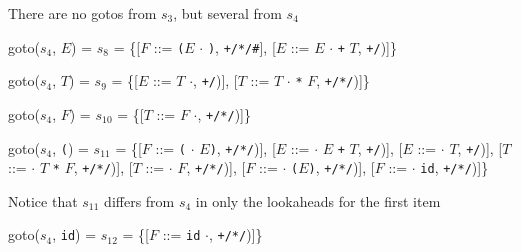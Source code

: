 \documentclass[8pt,a4paper,compress,handout]{beamer}
\newcommand{\mm}[1]{$#1$}
\newcommand{\subs}[2]{${#1}_{#2}$}
\newenvironment{spaced}
{
\smallskip
\hspace{.5cm}
\begin{minipage}[c]{\textwidth}
}
{
\end{minipage}
\smallskip
}
\begin{document}
\begin{frame}[fragile]
\pause

There are no gotos from $s_3$, but several from $s_4$

\text{ }
\begin{spaced}
\begin{production}
goto(\subs{s}{4}, \mm{E}) = \subs{s}{8}
                = \{[\mm{F}  ::= \lstinline{(}\mm{E} \mm{\cdot} \lstinline{)},  \lstinline{+/*/#}],
                    [\mm{E}  ::= \mm{E} \mm{\cdot} \lstinline{+} \mm{T}, \lstinline{+/})]\}

goto(\subs{s}{4}, \mm{T}) = \subs{s}{9}
                = \{[\mm{E}  ::= \mm{T} \mm{\cdot}, \lstinline{+/})],
                    [\mm{T}  ::= \mm{T} \mm{\cdot} \lstinline{*} \mm{F}, \lstinline{+/*/})]\}

goto(\subs{s}{4}, \mm{F}) = \subs{s}{10}
                = \{[\mm{T}  ::= \mm{F} \mm{\cdot}, \lstinline{+/*/})]\}

goto(\subs{s}{4}, \lstinline{(}) = \subs{s}{11}
               = \{[\mm{F}  ::= \lstinline{(} \mm{\cdot} \mm{E}\lstinline{)}, \lstinline{+/*/})],
                    [\mm{E}  ::= \mm{\cdot} \mm{E} \lstinline{+} \mm{T}, \lstinline{+/})],
                    [\mm{E}  ::= \mm{\cdot} \mm{T}, \lstinline{+/})],
                    [\mm{T}  ::= \mm{\cdot} \mm{T} \lstinline{*} \mm{F}, \lstinline{+/*/})],
                    [\mm{T}  ::= \mm{\cdot} \mm{F}, \lstinline{+/*/})],
                    [\mm{F}  ::= \mm{\cdot} \lstinline{(}\mm{E}\lstinline{)}, \lstinline{+/*/})],
                    [\mm{F}  ::= \mm{\cdot} \lstinline{id}, \lstinline{+/*/})]\}
\end{production}
\end{spaced}

\pause

Notice that $s_{11}$ differs from $s_4$ in only the lookaheads for the first item

\text{ }
\begin{spaced}
\begin{production}
goto(\subs{s}{4}, \lstinline{id}) = \subs{s}{12}
                = \{[\mm{F}  ::= \lstinline{id} \mm{\cdot}, \lstinline{+/*/})]\}
\end{production}
\end{spaced}
\end{frame}
\end{document}
